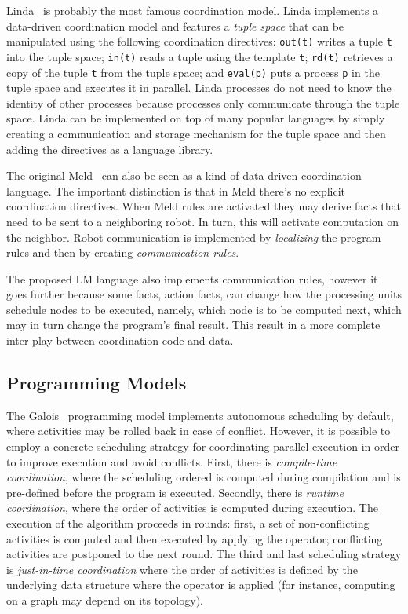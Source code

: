 Linda~\cite{linda} is probably the most famous coordination model. Linda
implements a data-driven coordination model and features a \emph{tuple space}
that can be manipulated using the following coordination directives:
\texttt{out(t)} writes a tuple \texttt{t} into the tuple space; \texttt{in(t)}
reads a tuple using the template \texttt{t}; \texttt{rd(t)} retrieves a copy of
the tuple \texttt{t} from the tuple space; and \texttt{eval(p)} puts a process
\texttt{p} in the tuple space and executes it in parallel.  Linda processes do
not need to know the identity of other processes because processes only
communicate through the tuple space.  Linda can be implemented on top of many
popular languages by simply creating a communication and storage mechanism for
the tuple space and then adding the directives as a language library.

The original Meld~\cite{ashley-rollman-iclp09} can also be seen as a kind of
data-driven coordination language. The important distinction is that in Meld
there's no explicit coordination directives. When Meld rules are activated they
may derive facts that need to be sent to a neighboring robot. In turn, this will
activate computation on the neighbor. Robot communication is implemented by
\emph{localizing} the program rules and then by creating \emph{communication
rules}.

The proposed LM language also implements communication rules, however it goes
further because some facts, action facts, can change how the processing units
schedule nodes to be executed, namely, which node is to be computed next, which
may in turn change the program's final result. This result in a more complete
inter-play between coordination code and data.

\subsection{Programming Models}

The Galois~\cite{Pingali:2011:TPA:1993316.1993501} programming model implements
autonomous scheduling by default, where activities may be rolled back in case of
conflict. However, it is possible to employ a concrete scheduling strategy for
coordinating parallel execution in order to improve execution and avoid
conflicts.  First, there is \emph{compile-time coordination}, where the
scheduling ordered is computed during compilation and is pre-defined before the
program is executed. Secondly, there is \emph{runtime coordination}, where the
order of activities is computed during execution. The execution of the algorithm
proceeds in rounds: first, a set of non-conflicting activities is computed and
then executed by applying the operator; conflicting activities are postponed to
the next round. The third and last scheduling strategy is \emph{just-in-time
coordination} where the order of activities is defined by the underlying data
structure where the operator is applied (for instance, computing on a graph
may depend on its topology).

